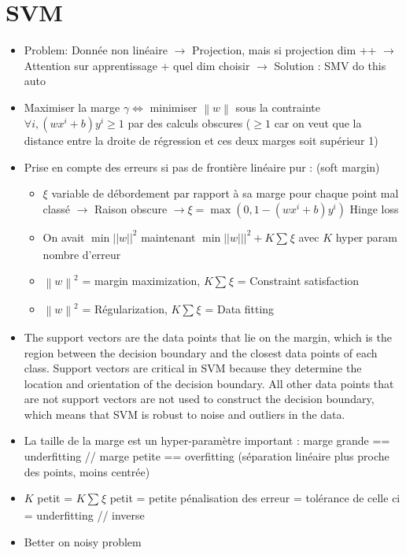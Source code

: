 \documentclass{article}
\theoremstyle{plain}%
\theoremstyle{definition}
\theoremstyle{remark}
\begin{document}
\section{SVM}
\begin{itemize}
    \item Problem: Donnée non linéaire $\rightarrow$ Projection, mais si projection dim ++ $\rightarrow$ Attention sur apprentissage + quel dim choisir $\rightarrow$ Solution : SMV do this auto
    \item Maximiser la marge $ \gamma  \Leftrightarrow $ minimiser $ \left\| w \right\| $ sous la contrainte $ \forall i, (wx^i + b)y^i \geq 1 $ par des calculs obscures ($ \geq 1 $ car on veut que la distance entre la droite de régression et ces deux marges soit supérieur 1)
    \item Prise en compte des erreurs si pas de frontière linéaire pur : (soft margin) \begin{itemize}
        \item $ \xi  $ variable de débordement par rapport à sa marge pour chaque point mal classé $\rightarrow$ Raison obscure $\rightarrow \xi = \max (0, 1 - (wx^i + b) y^i) $ Hinge loss
        \item On avait $\min ||w||^2$ maintenant $\min ||w|||^2 + K \sum_{}^{}\xi $ avec $K$ hyper param nombre d'erreur
        \item $ \left\| w  \right\| ^2  $ = margin maximization, $ K \sum_{}^{}\xi $ = Constraint satisfaction
        \item $ \left\| w  \right\| ^2  $ = Régularization, $ K \sum_{}^{}\xi $ = Data fitting
    \end{itemize}
    \item The support vectors are the data points that lie on the margin, which is the region between the decision boundary and the closest data points of each class. Support vectors are critical in SVM because they determine the location and orientation of the decision boundary. All other data points that are not support vectors are not used to construct the decision boundary, which means that SVM is robust to noise and outliers in the data.
    \item La taille de la marge est un hyper-paramètre important : marge grande == underfitting // marge petite == overfitting (séparation linéaire plus proche des points, moins centrée)
    \item $ K $ petit = $ K \sum_{}^{}\xi  $ petit = petite pénalisation des erreur = tolérance de celle ci = underfitting // inverse
    \item Better on noisy problem
\end{itemize}
\end{document}

